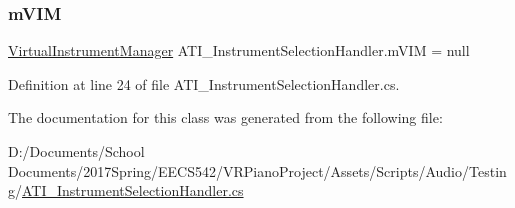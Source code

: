 \subsubsection{\texorpdfstring{m\+V\+IM}{mVIM}}
{\footnotesize\ttfamily \hyperlink{class_virtual_instrument_manager}{Virtual\+Instrument\+Manager} A\+T\+I\+\_\+\+Instrument\+Selection\+Handler.\+m\+V\+IM = null\hspace{0.3cm}{\ttfamily [private]}}



Definition at line 24 of file A\+T\+I\+\_\+\+Instrument\+Selection\+Handler.\+cs.



The documentation for this class was generated from the following file\+:\begin{DoxyCompactItemize}
\item 
D\+:/\+Documents/\+School Documents/2017\+Spring/\+E\+E\+C\+S542/\+V\+R\+Piano\+Project/\+Assets/\+Scripts/\+Audio/\+Testing/\hyperlink{_a_t_i___instrument_selection_handler_8cs}{A\+T\+I\+\_\+\+Instrument\+Selection\+Handler.\+cs}\end{DoxyCompactItemize}
